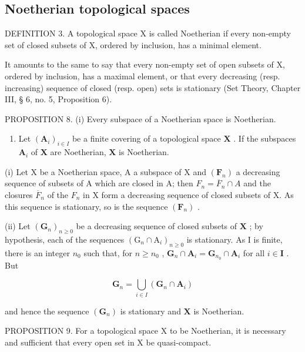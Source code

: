 \subsection{Noetherian topological spaces}

DEFINITION 3. A topological space X is called Noetherian if every non-empty set of closed subsets of X, ordered by inclusion, has a minimal element.

It amounts to the same to say that every non-empty set of open subsets of X, ordered by inclusion, has a maximal element, or that every decreasing (resp. increasing) sequence of closed (resp. open) sets is stationary (Set Theory, Chapter III, § 6, no. 5, Proposition 6).

PROPOSITION 8. (i) Every subspace of a Noetherian space is Noetherian.

\begin{enumerate}
\def\labelenumi{(\roman{enumi})}
\setcounter{enumi}{1}
\item
  Let \((\mathbf{A}_i)_{i\in I}\) be a finite covering of a topological space \(\mathbf{X}\) . If the subspaces \(\mathbf{A}_i\) of \(\mathbf{X}\) are Noetherian, \(\mathbf{X}\) is Noetherian.

\end{enumerate}

(i) Let X be a Noetherian space, A a subspace of X and \((\mathbf{F}_{n})\) a decreasing sequence of subsets of A which are closed in A; then \(F_{n} = \overline{F}_{n} \cap A\) and the closures \(\overline{F}_{n}\) of the \(F_{n}\) in X form a decreasing sequence of closed subsets of X. As this sequence is stationary, so is the sequence \((\mathbf{F}_{n})\) .

(ii) Let \((\mathbf{G}_n)_{n\geqslant 0}\) be a decreasing sequence of closed subsets of \(\mathbf{X}\) ; by hypothesis, each of the sequences \((\mathrm{G}_n\cap \mathrm{A}_i)_{n\geqslant 0}\) is stationary. As I is finite, there is an integer \(n_0\) such that, for \(n\geqslant n_0\) , \(\mathbf{G}_n\cap \mathbf{A}_i = \mathbf{G}_{n_0}\cap \mathbf{A}_i\) for all \(i\in \mathbf{I}\) . But

\[
\mathbf {G} _ {n} = \bigcup_ {i \in I} \left(\mathbf {G} _ {n} \cap \mathbf {A} _ {i}\right)
\]

and hence the sequence \((\mathbf{G}_n)\) is stationary and \(\mathbf{X}\) is Noetherian.

PROPOSITION 9. For a topological space X to be Noetherian, it is necessary and sufficient that every open set in X be quasi-compact.


